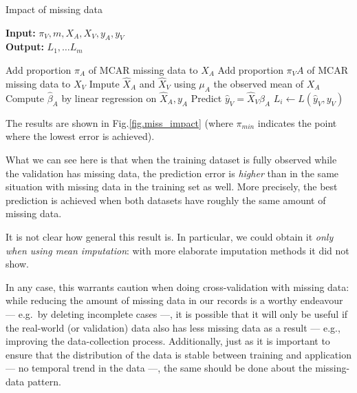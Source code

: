 \begin{algorithm}[H]
	\caption{Impact of missing data}
	\hspace*{\algorithmicindent} \textbf{Input:} $\pi_V, m, X_A, X_V, y_A,y_V$  \\
	\hspace*{\algorithmicindent} \textbf{Output:} $L_1, \ldots L_m$  \\
	\begin{algorithmic}[1]
			\State Add proportion $\pi_A$ of MCAR missing data to $X_A$
			\State Add proportion $\pi_VA$ of MCAR missing data to $X_V$
			\State Impute $\hat{X}_A$ and $\hat{X}_V$ using $\mu_A$ the observed mean of $X_A$
			\State Compute $\hat{\beta}_A$ by linear regression on $\hat{X}_A, y_A$
			\State Predict $\hat{y}_V = \hat{X}_V \hat{\beta}_A$
			\State $L_i \leftarrow L(\hat{y}_V, y_V)$
		\EndFor
	\end{algorithmic}
\end{algorithm}

The results are shown in Fig.\ref{fig.miss_impact} (where $\pi_{min}$ indicates the point where the lowest error is achieved).



What we can see here is that when the training dataset is fully observed while the validation has missing data, the prediction error is \emph{higher} than in the same situation with missing data in the training set as well. More precisely, the best prediction is achieved when both datasets have roughly the same amount of missing data.

It is not clear how general this result is. In particular, we could obtain it \emph{only when using mean imputation}: with more elaborate imputation methods it did not show. 

 In any case, this warrants caution when doing cross-validation with missing data: while reducing the amount of missing data in our records is a worthy endeavour --- e.g.\ by deleting incomplete cases ---, it is possible that it will only be useful if the real-world (or validation) data also has less missing data as a result --- e.g., improving the data-collection process. Additionally, just as it is important to ensure that the distribution of the data is stable between training and application --- no temporal trend in the data ---, the same should be done about the missing-data pattern.

